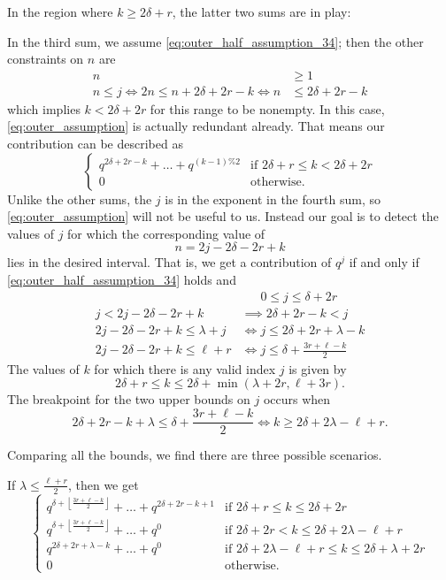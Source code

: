 In the region where $k \ge 2\delta + r$, the latter two sums are in play:
\begin{itemize}
  \ii In the third sum, we assume \eqref{eq:outer_half_assumption_34};
  then the other constraints on $n$ are
  \begin{align*}
    n &\ge 1 \\
    n \le j \iff 2n \le n+2\delta+2r-k \iff n &\le 2\delta + 2r - k
  \end{align*}
  which implies $k < 2 \delta + 2r$ for this range to be nonempty.
  In this case, \eqref{eq:outer_assumption} is actually redundant already.
  That means our contribution can be described as
  \[
    \begin{cases}
      q^{2\delta+2r-k} + \dots + q^{(k-1)\%2} & \text{if } 2\delta+r \le k < 2\delta+2r \\
      0 & \text{otherwise}.
    \end{cases}
  \]
  \ii Unlike the other sums, the $j$ is in the exponent in the fourth sum,
  so \eqref{eq:outer_assumption} will not be useful to us.
  Instead our goal is to detect the values of $j$ for which the corresponding value of
  \[ n = 2j-2\delta-2r+k \]
  lies in the desired interval.
  That is, we get a contribution of $q^j$ if and only if
  \eqref{eq:outer_half_assumption_34} holds and
  \begin{align*}
    &\phantom{\iff} 0 \le j \le \delta + 2r \\
    j < 2j-2\delta-2r+k &\implies 2\delta+2r-k < j \\
    2j-2\delta-2r+k \le \lambda+j &\iff j \le 2\delta+2r+\lambda-k \\
    2j-2\delta-2r+k \le \ell+r &\iff j \le \delta+\frac{3r+\ell-k}{2}
  \end{align*}
  The values of $k$ for which there is any valid index $j$ is given by
  \[ 2\delta + r \le k \le 2 \delta + \min \left( \lambda + 2r, \ell + 3r \right). \]
  The breakpoint for the two upper bounds on $j$ occurs when
  \[ 2\delta+2r-k+\lambda \le \delta+\frac{3r+\ell-k}{2}
    \iff k \ge 2\delta + 2\lambda - \ell + r. \]

  Comparing all the bounds, we find there are three possible scenarios.
  \begin{itemize}
    \ii If $\lambda \le \frac{\ell+r}{2}$, then we get
    \[
      \begin{cases}
        q^{\delta+\left\lfloor\frac{3r+\ell-k}{2}\right\rfloor} + \dots + q^{2\delta+2r-k+1}
          & \text{if } 2\delta+r \le k \le 2\delta+2r  \\
        q^{\delta+\left\lfloor\frac{3r+\ell-k}{2}\right\rfloor} + \dots + q^{0}
          & \text{if } 2\delta+2r < k \le 2\delta+2\lambda-\ell+r  \\
        q^{2\delta+2r+\lambda-k} + \dots + q^0
          & \text{if } 2\delta+2\lambda-\ell+r \le k \le 2\delta+\lambda+2r \\
        0 & \text{otherwise}.
      \end{cases}
    \]


\end{itemize}
\end{itemize}
